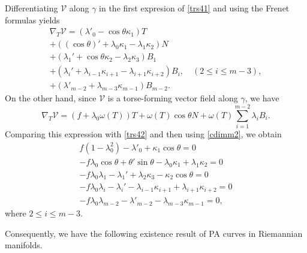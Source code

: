 \documentclass[12pt]{amsart}
\def\v{\mathcal V}
\theoremstyle{definition}
\begin{document}
Differentiating $\v$ along $\gamma$ in the first expresion of \eqref{trs41} and using the Frenet formulas yields
\begin{equation}
\left. 
\begin{array}{l}
\nabla_T\v= (\lambda'_0-\cos\theta \kappa_1)T\\
+((\cos \theta)'+\lambda_0\kappa_1-\lambda_1\kappa_2)N \\
+(\lambda_1'+\cos\theta\kappa_2-\lambda_2\kappa_3)B_1\\
+(\lambda_i'+\lambda_{i-1}\kappa_{i+1}-\lambda_{i+1}\kappa_{i+2})B_i, \quad (2\leq i \leq m-3),\\
+(\lambda'_{m-2}+\lambda_{m-3}\kappa_{m-1})B_{m-2} .
\end{array}%
\right. \label{trs42}
\end{equation}
On the other hand, since $\v$ is a torse-forming vector field along $\gamma$, we have
$$
\nabla_T\v=(f+\lambda_0\omega(T))T+\omega(T)\cos\theta N+\omega(T)\sum_{i=1}^{m-2}\lambda_iB_{i}.
$$
Comparing this expression with \eqref{trs42} and then using \eqref{cdimm2}, we obtain
\begin{equation}
\left. 
\begin{array}{r}
f(1-\lambda_0^2)-\lambda'_0+ \kappa_1\cos\theta=0\\
-f\lambda_0\cos\theta+\theta'\sin \theta-\lambda_0\kappa_1+\lambda_1\kappa_2=0 \\
-f\lambda_0\lambda_1-\lambda_1'+\lambda_2\kappa_3-\kappa_2\cos\theta=0\\
-f\lambda_0\lambda_i-\lambda_i'-\lambda_{i-1}\kappa_{i+1}+\lambda_{i+1}\kappa_{i+2}=0 \\
-f\lambda_0\lambda_{m-2}-\lambda'_{m-2}-\lambda_{m-3}\kappa_{m-1}=0,
\end{array}%
\right. \label{trs43}
\end{equation}
where $2\leq i \leq m-3$.

Consequently, we have the following existence result of PA curves in Riemannian manifolds.
\end{document}
